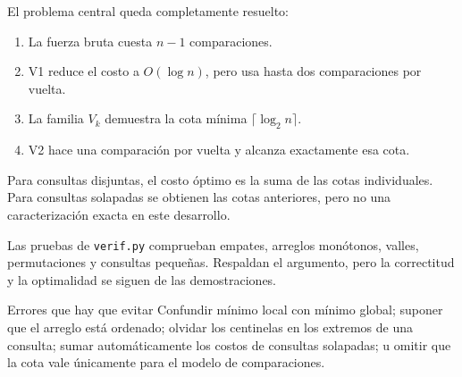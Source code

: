 \documentclass[11pt]{article}
\begin{document}
El problema central queda completamente resuelto:

\begin{enumerate}[leftmargin=22pt]
\item La fuerza bruta cuesta $n-1$ comparaciones.
\item V1 reduce el costo a $O(\log n)$, pero usa hasta dos comparaciones por vuelta.
\item La familia $V_k$ demuestra la cota mínima $\lceil\log_2n\rceil$.
\item V2 hace una comparación por vuelta y alcanza exactamente esa cota.
\end{enumerate}

Para consultas disjuntas, el costo óptimo es la suma de las cotas individuales. Para consultas solapadas se
obtienen las cotas anteriores, pero no una caracterización exacta en este desarrollo.

Las pruebas de \texttt{verif.py} comprueban empates, arreglos monótonos, valles, permutaciones y consultas
pequeñas. Respaldan el argumento, pero la correctitud y la optimalidad se siguen de las demostraciones.

\begin{alerta}{Errores que hay que evitar}
Confundir mínimo local con mínimo global; suponer que el arreglo está ordenado; olvidar los centinelas en
los extremos de una consulta; sumar automáticamente los costos de consultas solapadas; u omitir que la cota
vale únicamente para el modelo de comparaciones.
\end{alerta}
\end{document}
